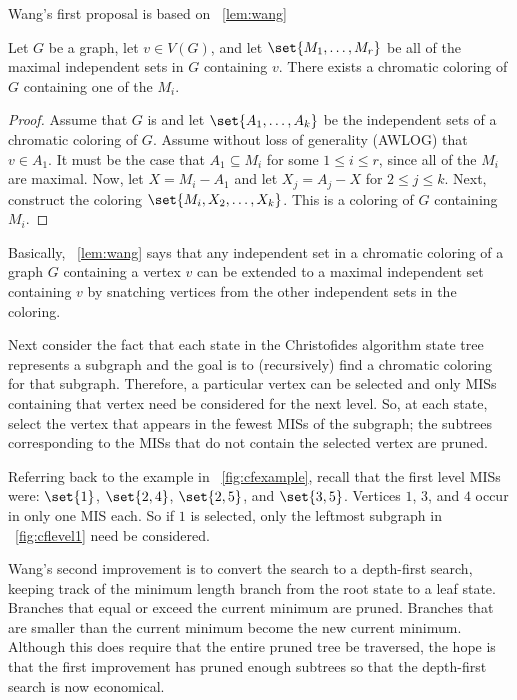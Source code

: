 Wang's first proposal is based on \lemmaname~\ref{lem:wang}

\begin{lemma}
  \label{lem:wang}
  Let \(G\) be a graph, let \(v\in V(G)\), and let \(\set{M_1,\ldots,M_r}\) be all of the maximal independent sets
  in \(G\) containing \(v\).  There exists a chromatic coloring of \(G\) containing one of the \(M_i\).
\end{lemma}

\begin{proof}
  Assume that \(G\) is  and let \(\set{A_1,\ldots,A_k}\) be the independent sets of a chromatic
  coloring of \(G\).  Assume without loss of generality (AWLOG) that \(v\in A_1\).  It must be the case that
  \(A_1\subseteq M_i\) for some \(1\le i\le r\), since all of the \(M_i\) are maximal.  Now, let \(X=M_i-A_1\) and
  let \(X_j=A_j-X\) for \(2\le j\le k\).  Next, construct the coloring \(\set{M_i,X_2,\ldots,X_k}\).  This is a
   coloring of \(G\) containing \(M_i\).
\end{proof}

Basically, \lemmaname~\ref{lem:wang} says that any independent set in a chromatic coloring of a graph \(G\)
containing a vertex \(v\) can be extended to a maximal independent set containing \(v\) by snatching vertices from
the other independent sets in the coloring.

Next consider the fact that each state in the Christofides algorithm state tree represents a subgraph and the goal
is to (recursively) find a chromatic coloring for that subgraph.  Therefore, a particular vertex can be selected
and only MISs containing that vertex need be considered for the next level.  So, at each state, select the vertex
that appears in the fewest MISs of the subgraph; the subtrees corresponding to the MISs that do not contain the
selected vertex are pruned.

Referring back to the example in \figurename~\ref{fig:cfexample}, recall that the first level MISs were:
\(\set{1}\), \(\set{2,4}\), \(\set{2,5}\), and \(\set{3,5}\).  Vertices \(1\), \(3\), and \(4\) occur in only
one MIS each.  So if \(1\) is selected, only the leftmost subgraph in \figurename~\ref{fig:cflevel1} need be
considered.

Wang's second improvement is to convert the search to a depth-first search, keeping track of the minimum length
branch from the root state to a leaf state.  Branches that equal or exceed the current minimum are pruned.
Branches that are smaller than the current minimum become the new current minimum.  Although this does require that
the entire pruned tree be traversed, the hope is that the first improvement has pruned enough subtrees so that the
depth-first search is now economical.

